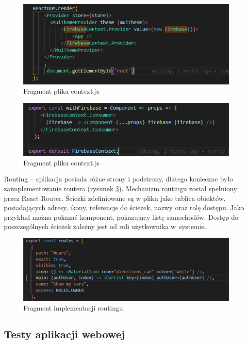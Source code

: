 \documentclass[12pt]{article}
\begin{document}
	 \begin{figure}[H]
		\centering
		\includegraphics[scale=0.8]{web5.png}
		\caption{Fragment pliku context.js}
		\label{web5}
	\end{figure}
	 \begin{figure}[H]
		\centering
		\includegraphics[scale=0.8]{web6.png}
		\caption{Fragment pliku context.js}
		\label{web6}
	\end{figure}

Routing – aplikacja posiada różne strony i podstrony, dlatego konieczne było zaimplementowanie routera (rysunek \ref{web7}). Mechanizm routingu został spełniony przez React Router. Ścieżki zdefiniowane są w pliku jako tablica obiektów, posiadających adresy, ikony, referencje do ścieżek, nazwy oraz rolę dostępu. Jako przykład można pokazać komponent, pokazujący listę samochodów. Dostęp do poszczególnych ścieżek zależny jest od roli użytkownika w~systemie.  
	 \begin{figure}[H]
		\centering
		\includegraphics[scale=1]{web7.png}
		\caption{Fragment implementacji routingu}
		\label{web7}
	\end{figure}
	
\subsection{Testy aplikacji webowej}
\end{document}
